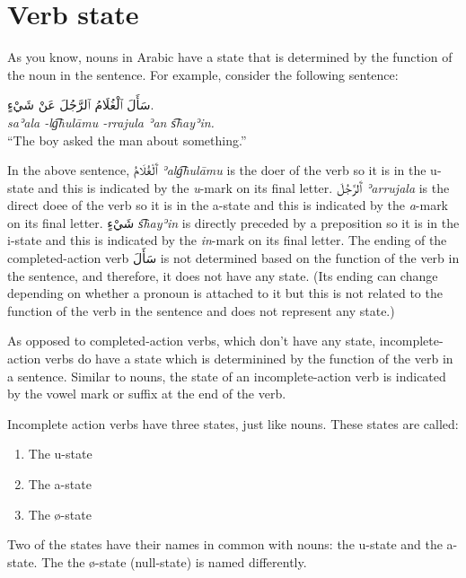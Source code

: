 \documentclass[
  10pt,
]{book}
\providecommand{\tightlist}{%
  \setlength{\itemsep}{0pt}\setlength{\parskip}{0pt}}
\begin{document}
\section{Verb state}\label{verb-state}

As you know, nouns in Arabic have a state that is determined by the function of the noun in the sentence. For example, consider the following sentence:

\foreignlanguage{arabic}{سَأَلَ ٱلْغُلَامُ ٱلرَّجُلَ عَنْ شَيْءٍ.}\\
\emph{saʾala -lg͡hulāmu -rrajula ʾan s͡hayʾin.}\\
\enquote{The boy asked the man about something.}

In the above sentence, \foreignlanguage{arabic}{ٱَلْغُلَامُ} \emph{ʾalg͡hulāmu} is the doer of the verb so it is in the u-state and this is indicated by the \emph{u}-mark on its final letter.
\foreignlanguage{arabic}{ٱَلرَّجُلَ} \emph{ʾarrujala} is the direct doee of the verb so it is in the a-state and this is indicated by the \emph{a}-mark on its final letter.
\foreignlanguage{arabic}{شَيْءٍ} \emph{s͡hayʾin} is directly preceded by a preposition so it is in the i-state and this is indicated by the \emph{in}-mark on its final letter.
The ending of the completed-action verb \foreignlanguage{arabic}{سَأَلَ} is not determined based on the function of the verb in the sentence, and therefore, it does not have any state. (Its ending can change depending on whether a pronoun is attached to it but this is not related to the function of the verb in the sentence and does not represent any state.)

As opposed to completed-action verbs, which don't have any state, incomplete-action verbs do have a state which is determinined by the function of the verb in a sentence. Similar to nouns, the state of an incomplete-action verb is indicated by the vowel mark or suffix at the end of the verb.

Incomplete action verbs have three states, just like nouns. These states are called:

\begin{enumerate}
\def\labelenumi{\roman{enumi}.}
\tightlist
\item
  The u-state
\item
  The a-state
\item
  The ø-state
\end{enumerate}

Two of the states have their names in common with nouns: the u-state and the a-state. The the ø-state (null-state) is named differently.
\end{document}
